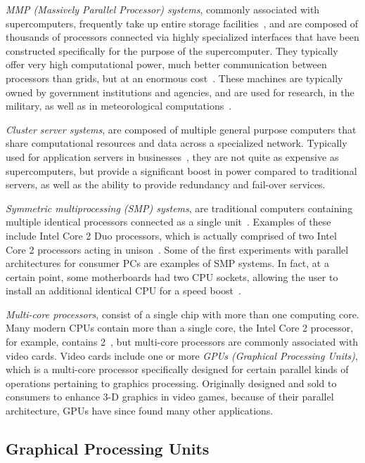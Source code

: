 \emph{MMP (Massively Parallel Processor) systems}, commonly associated
with supercomputers, frequently take up entire storage
facilities~\cite{supercomputer-size}, and are composed of thousands of
processors connected via highly specialized interfaces that have been
constructed specifically for the purpose of the supercomputer. They
typically offer very high computational power, much better
communication between processors than grids, but at an enormous
cost~\cite{supercomputer-cost}. These machines are typically owned by
government institutions and agencies, and are used for research, in
the military, as well as in meteorological
computations~\cite{supercomputer-use}.

\emph{Cluster server systems}, are composed of multiple general
purpose computers that share computational resources and data across a
specialized network. Typically used for application servers in
businesses~\cite{clusters-in-business}, they are not quite as
expensive as supercomputers, but provide a significant boost in power
compared to traditional servers, as well as the ability to provide
redundancy and fail-over services.

\emph{Symmetric multiprocessing (SMP) systems}, are traditional
computers containing multiple identical processors connected as a
single unit~\cite{smp}. Examples of these include Intel Core 2 Duo
processors, which is actually comprised of two Intel Core 2 processors
acting in unison~\cite{intelcore2duo}. Some of the first experiments
with parallel architectures for consumer PCs are examples of SMP
systems. In fact, at a certain point, some motherboards had two CPU
sockets, allowing the user to install an additional identical CPU for
a speed boost~\cite{two-cpus}.

\emph{Multi-core processors}, consist of a single chip with more than
one computing core. Many modern CPUs contain more than a single core,
the Intel Core 2 processor, for example, contains 2~\cite{intelcore2},
but multi-core processors are commonly associated with video
cards. Video cards include one or more \emph{GPUs (Graphical
  Processing Units)}, which is a multi-core processor specifically
designed for certain parallel kinds of operations pertaining to
graphics processing. Originally designed and sold to consumers to
enhance 3-D graphics in video games, because of their parallel
architecture, GPUs have since found many other applications.

\subsection{Graphical Processing Units}

